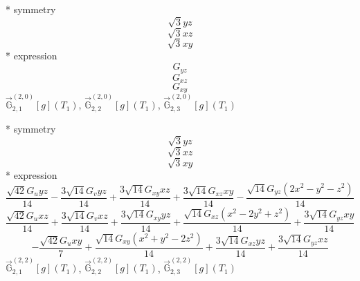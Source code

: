 \documentclass[fleqn,8pt]{jsarticle}
\begin{document}
\noindent\quad ** symmetry
\begin{dmath*}
\sqrt{3} y z
\end{dmath*}
\begin{dmath*}
\sqrt{3} x z
\end{dmath*}
\begin{dmath*}
\sqrt{3} x y
\end{dmath*}
\noindent\quad ** expression
\begin{dmath*}
G_{yz}
\end{dmath*}
\begin{dmath*}
G_{xz}
\end{dmath*}
\begin{dmath*}
G_{xy}
\end{dmath*}
\noindent\quad $\vec{\mathbb{G}}_{2,1}^{(2,0)}[g](T_{1})$, $\vec{\mathbb{G}}_{2,2}^{(2,0)}[g](T_{1})$, $\vec{\mathbb{G}}_{2,3}^{(2,0)}[g](T_{1})$

\noindent\quad ** symmetry
\begin{dmath*}
\sqrt{3} y z
\end{dmath*}
\begin{dmath*}
\sqrt{3} x z
\end{dmath*}
\begin{dmath*}
\sqrt{3} x y
\end{dmath*}
\noindent\quad ** expression
\begin{dmath*}
\frac{\sqrt{42} G_{u} y z}{14} - \frac{3 \sqrt{14} G_{v} y z}{14} + \frac{3 \sqrt{14} G_{xy} x z}{14} + \frac{3 \sqrt{14} G_{xz} x y}{14} - \frac{\sqrt{14} G_{yz} \left(2 x^{2} - y^{2} - z^{2}\right)}{14}
\end{dmath*}
\begin{dmath*}
\frac{\sqrt{42} G_{u} x z}{14} + \frac{3 \sqrt{14} G_{v} x z}{14} + \frac{3 \sqrt{14} G_{xy} y z}{14} + \frac{\sqrt{14} G_{xz} \left(x^{2} - 2 y^{2} + z^{2}\right)}{14} + \frac{3 \sqrt{14} G_{yz} x y}{14}
\end{dmath*}
\begin{dmath*}
- \frac{\sqrt{42} G_{u} x y}{7} + \frac{\sqrt{14} G_{xy} \left(x^{2} + y^{2} - 2 z^{2}\right)}{14} + \frac{3 \sqrt{14} G_{xz} y z}{14} + \frac{3 \sqrt{14} G_{yz} x z}{14}
\end{dmath*}
\noindent\quad $\vec{\mathbb{G}}_{2,1}^{(2,2)}[g](T_{1})$, $\vec{\mathbb{G}}_{2,2}^{(2,2)}[g](T_{1})$, $\vec{\mathbb{G}}_{2,3}^{(2,2)}[g](T_{1})$
\end{document}
